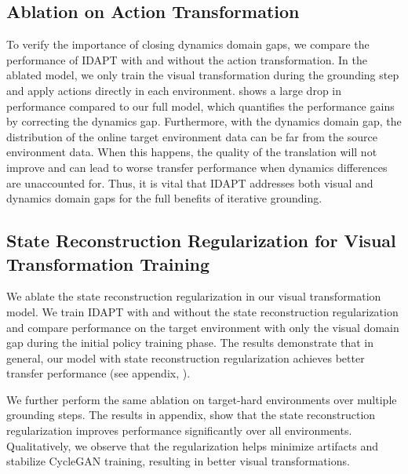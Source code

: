 \subsection{Ablation on Action Transformation}

To verify the importance of closing dynamics domain gaps, we compare the performance of IDAPT with and without the action transformation.  In the ablated model, we only train the visual transformation during the grounding step and apply actions directly in each environment.   shows a large drop in performance compared to our full model, which quantifies the performance gains by correcting the dynamics gap. Furthermore, with the dynamics domain gap, the distribution of the online target environment data can be far from the source environment data.  When this happens, the quality of the translation will not improve and can lead to worse transfer performance when dynamics differences are unaccounted for.  Thus, it is vital that IDAPT addresses both visual and dynamics domain gaps for the full benefits of iterative grounding.


\subsection{State Reconstruction Regularization for Visual Transformation Training}

We ablate the state reconstruction regularization in our visual transformation model.  We train IDAPT with and without the state reconstruction regularization and compare performance on the target environment with only the visual domain gap during the initial policy training phase. The results demonstrate that in general, our model with state reconstruction regularization achieves better transfer performance (see appendix, ).

We further perform the same ablation on target-hard environments over multiple grounding steps. The results in appendix,  show that the state reconstruction regularization improves performance significantly over all environments.  Qualitatively, we observe that the regularization helps minimize artifacts and stabilize CycleGAN training, resulting in better visual transformations.
